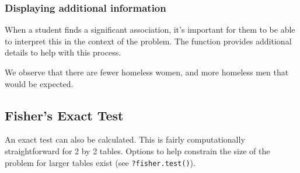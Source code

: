 \subsubsection{Displaying additional information}

When a student finds a significant association, 
it's important for them to be able to interpret this in the context of the problem. 
The  function provides additional details to help with this process.

\begin{knitrout}
\end{knitrout}


We observe that there are fewer homeless women, and more homeless men that would be expected.

\subsection{Fisher's Exact Test}

An exact test can also be calculated.  This is fairly computationally straightforward for 2 by 2
tables.  Options to help constrain the size of the problem for larger tables exist
(see \verb!?fisher.test()!).

